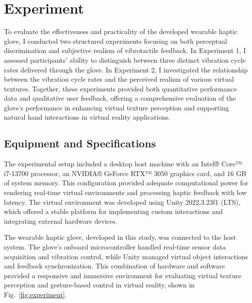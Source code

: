\chapter{Experiment} %

\label{Chapter4} %






To evaluate the effectiveness and practicality of the developed wearable haptic glove, I conducted two structured experiments focusing on both perceptual discrimination and subjective realism of vibrotactile feedback. 
In Experiment 1, I assessed participants' ability to distinguish between three distinct vibration cycle rates delivered through the glove. 
In Experiment 2, I investigated the relationship between the vibration cycle rates and the perceived realism of various virtual textures. 
Together, these experiments provided both quantitative performance data and qualitative user feedback, offering a comprehensive evaluation of the glove’s performance in enhancing virtual texture perception and supporting natural hand interactions in virtual reality applications.

\section{Equipment and Specifications}
The experimental setup included a desktop host machine with an Intel® Core™ i7-13700 processor, an NVIDIA® GeForce RTX™ 3050 graphics card, and 16 GB of system memory. This configuration provided adequate computational power for rendering real-time virtual environments and processing haptic feedback with low latency. The virtual environment was developed using Unity 2022.3.23f1 (LTS), which offered a stable platform for implementing custom interactions and integrating external hardware devices.

The wearable haptic glove, developed in this study, was connected to the host system. The glove’s onboard microcontroller handled real-time sensor data acquisition and vibration control, while Unity managed virtual object interactions and feedback synchronization. This combination of hardware and software provided a responsive and immersive environment for evaluating virtual texture perception and gesture-based control in virtual reality, shown in Fig.~\ref{fig:experiment}.

